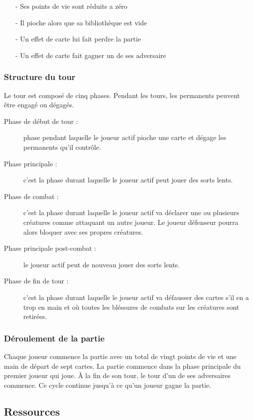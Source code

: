 \documentclass[a4paper,12pt]{article}
\begin{document}
\begin{itemize}
\item[-] Ses points de vie sont réduits a zéro
\item[-] Il pioche alors que sa bibliothèque est vide
\item[-] Un effet de carte lui fait perdre la partie
\item[-] Un effet de carte fait gagner un de ses adversaire
\end{itemize}

\subsubsection{Structure du tour}
Le tour est composé de cinq phases.
Pendant les tours, les permanents peuvent être engagé ou dégagés.

\begin{description}
\item[Phase de début de tour :] phase pendant laquelle le joueur actif pioche une carte et dégage les permanents qu'il contrôle.
\item[Phase principale :] c'est la phase durant laquelle le joueur actif peut jouer des sorts lents.
\item[Phase de combat :] c'est la phase durant laquelle le joueur actif va déclarer une ou plusieurs créatures comme attaquant un autre joueur. Le joueur défenseur pourra alors bloquer avec ses propres créatures.
\item[Phase principale post-combat :] le joueur actif peut de nouveau jouer des sorts lents.
\item[Phase de fin de tour :] c'est la phase durant laquelle le joueur actif va défausser des cartes s'il en a trop en main et où toutes les bléssures de combats sur les créatures sont retirées.
\end{description}

\subsubsection{Déroulement de la partie}

Chaque joueur commence la partie avec un total de vingt points de vie et une main de départ de sept cartes.
La partie commence dans la phase principale du premier joueur qui joue.
À la fin de son tour, le tour d'un de ses adversaires commence.
Ce cycle continue jusqu'à ce qu'un joueur gagne la partie.

\subsection{Ressources}
\end{document}
